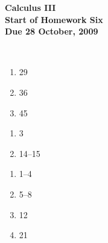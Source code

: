 \documentclass[12pt]{article}
\begin{document}
\pagestyle{empty}
 
\begin{center}
{\large {\bf Calculus III}}\\
\medskip
{\large {\bf Start of Homework Six}}\\
\medskip
{ {\bf Due 28 October, 2009}}\\
\end{center}

\hspace{2mm}\\




\begin{enumerate}
\setlength{\itemsep}{-1mm}
  \item 29
  \item 36
  \item 45
\end{enumerate}


\begin{enumerate}
\setlength{\itemsep}{-1mm}
  \item 3
  \item 14--15
\end{enumerate}

\begin{enumerate}
\setlength{\itemsep}{-1mm}
  \item 1--4
  \item 5--8
  \item 12
  \item 21
\end{enumerate}
\end{document}
